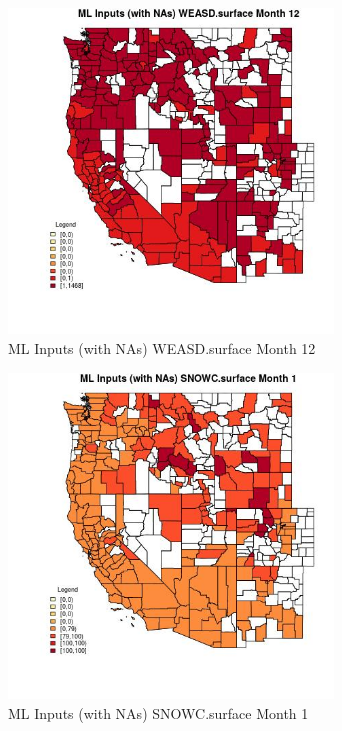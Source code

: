 \begin{figure} 
\centering  
\includegraphics[width=0.77\textwidth]{Code_Outputs/Report_ML_input_PM25_Step4_part_f_de_duplicated_aveswNAs_CountyWEASDsurfacemedianMonth12.jpg} 
\caption{\label{fig:Report_ML_input_PM25_Step4_part_f_de_duplicated_aveswNAsCountyWEASDsurfacemedianMonth12}ML Inputs (with NAs) WEASD.surface Month 12} 
\end{figure} 
 

\begin{figure} 
\centering  
\includegraphics[width=0.77\textwidth]{Code_Outputs/Report_ML_input_PM25_Step4_part_f_de_duplicated_aveswNAs_CountySNOWCsurfacemedianMonth1.jpg} 
\caption{\label{fig:Report_ML_input_PM25_Step4_part_f_de_duplicated_aveswNAsCountySNOWCsurfacemedianMonth1}ML Inputs (with NAs) SNOWC.surface Month 1} 
\end{figure} 
 

